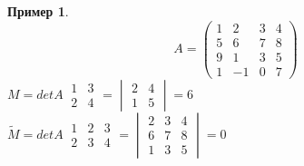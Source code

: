 \documentclass[a4paper, 12pt]{article}
\theoremstyle{definition}
\newtheorem*{example1}{Пример}
\begin{document}
  \begin{example1}
    $$A = \begin{pmatrix}
      1 & 2 & 3 & 4 \\
      5 & 6 & 7 & 8 \\
      9 & 1 & 3 & 5 \\
      1 & -1 & 0 & 7
    \end{pmatrix}$$ 
    $M = detA \ \begin{matrix}
      1 & 3 \\ 2 & 4
    \end{matrix} = \begin{vmatrix}
      2 & 4 \\ 1 & 5
    \end{vmatrix} = 6$ \vspace{0.3cm}\\
    $\widetilde{M} = detA \ \begin{matrix}
      1 & 2 & 3 \\ 2 & 3 & 4
    \end{matrix} = \begin{vmatrix}
      2 & 3 & 4 \\ 6 & 7 & 8 \\ 1 & 3 & 5
    \end{vmatrix} = 0$  
  \end{example1}
  
\end{document}
